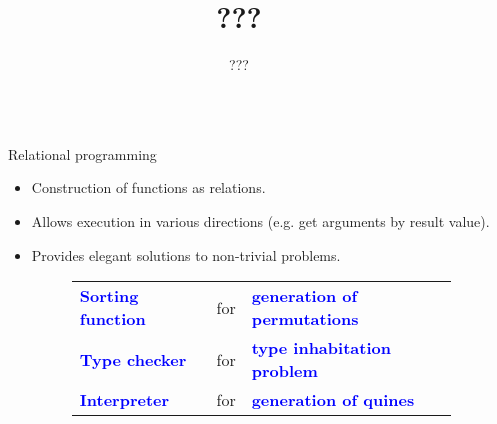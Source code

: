\documentclass[final]{beamer}
\title{???} %
\author{???} %
\institute{???} %
\newlength{\sepwid}
\newlength{\onecolwid}
\begin{document}

\setlength{\belowcaptionskip}{2ex} %
\setlength\belowdisplayshortskip{2ex} %

\begin{frame}[fragile] %

\begin{columns}[t] %


\begin{column}{\sepwid}\end{column} %


\begin{column}{\onecolwid} %

\begin{block}{Relational programming}

\begin{itemize}

\item Construction of functions as relations.

\item Allows execution in various directions \linebreak (e.g. get arguments by result value).

\item Provides elegant solutions to non-trivial problems.

\begin{figure}
  \begin{tabular}{ l c l }
    \textbf{\textcolor{blue}{Sorting function}} & for & \textbf{\textcolor{blue}{generation of permutations}}  \\
    \textbf{\textcolor{blue}{Type checker}}     & for & \textbf{\textcolor{blue}{type inhabitation problem}}     \\
    \textbf{\textcolor{blue}{Interpreter}}          & for & \textbf{\textcolor{blue}{generation of quines}}                      
  \end{tabular}
\end{figure}


\end{itemize}
\end{block}
\end{column}
\end{columns}
\end{frame}
\end{document}
